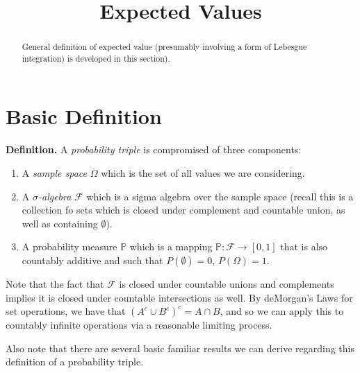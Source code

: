 \documentclass{article}
\begin{document}
\title{Expected Values}

\maketitle

\medskip 


\begin{abstract}

General definition of expected value (presumably involving a form of Lebesgue integration) is
developed in this section). 

\end{abstract}

\bigskip

\section{Basic Definition} 

\noindent \textbf{Definition.} A \emph{probability triple} is compromised of three components:

\begin{enumerate}

\item A \emph{sample space} $\Omega$ which is the set of all values we are considering.

\item A \emph{$\sigma$-algebra} $\mathcal{F}$ which is a sigma algebra over the sample space (recall this is a collection fo sets which is closed under complement and countable union, as well as containing $\emptyset$). 

\item A probability measure $\mathbb{P}$ which is a mapping $\mathbb{P}:\mathcal{F} \to [0,1]$ that is also countably additive and such that $P(\emptyset) = 0$, $P(\Omega) = 1$. 

\end{enumerate}

Note that the fact that $\mathcal{F}$ is closed under countable unions and complements implies it is closed under countable intersections as well. By deMorgan's Laws for set operations, we have that $(A^c \cup B^c)^c = A \cap B$, and so we can apply this to countably infinite operations via a reasonable limiting process. 

Also note that there are several basic familiar results we can derive regarding this definition of a probability triple. 
\end{document}
